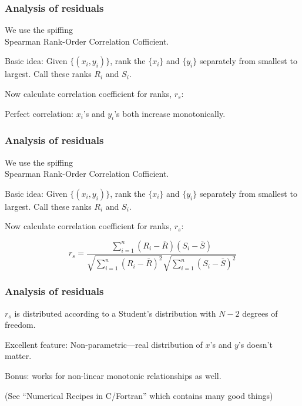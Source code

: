\begin{frame}
  \frametitle{Analysis of residuals}

We use the spiffing \\
Spearman Rank-Order Correlation Cofficient.

Basic idea:  Given $\{(x_i,y_i)\}$, rank 
the $\{x_i\}$ and $\{y_i\}$ separately from
smallest to largest.  Call these ranks $R_i$ and $S_i$.

Now calculate correlation coefficient for ranks, $r_s$:

{\small
{}
}

\inv

Perfect correlation: $x_i$'s and $y_i$'s both
increase monotonically.

\vis


\end{frame}

\begin{frame}
  \frametitle{Analysis of residuals}

We use the spiffing \\
Spearman Rank-Order Correlation Cofficient.

Basic idea:  Given $\{(x_i,y_i)\}$, rank 
the $\{x_i\}$ and $\{y_i\}$ separately from
smallest to largest.  Call these ranks $R_i$ and $S_i$.

Now calculate correlation coefficient for ranks, $r_s$:

{\small
$$ r_s 
= 
\frac{
  \sum_{i=1}^{n} (R_i - \bar{R})(S_i - \bar{S})
}
{
  \sqrt{\sum_{i=1}^{n} (R_i - \bar{R})^2}
  \sqrt{\sum_{i=1}^{n} (S_i - \bar{S})^2}
}
$$
}


\vis


\end{frame}

\begin{frame}
  \frametitle{Analysis of residuals}


\inv

$r_s$ is distributed according to a Student's distribution
with $N-2$ degrees of freedom.

Excellent feature: Non-parametric---real distribution
of $x$'s and $y$'s doesn't matter.

Bonus: works for non-linear monotonic relationships as well.

{\tiny (See ``Numerical Recipes in C/Fortran'' which contains many good things)}

\vis

\end{frame}

